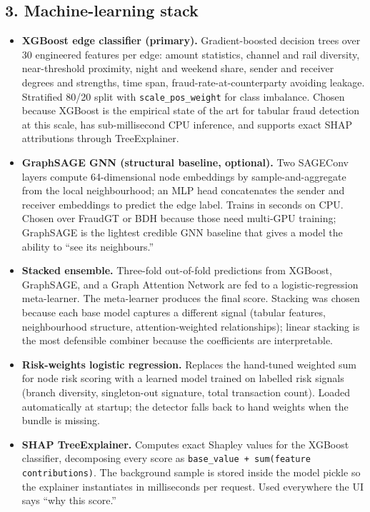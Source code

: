 \documentclass[10pt,a4paper]{article}
\begin{document}
\newpage

\subsection*{3. Machine-learning stack}
\begin{itemize}
  \item \textbf{XGBoost edge classifier (primary).} Gradient-boosted decision trees over 30 engineered features per edge: amount statistics, channel and rail diversity, near-threshold proximity, night and weekend share, sender and receiver degrees and strengths, time span, fraud-rate-at-counterparty avoiding leakage. Stratified 80/20 split with \texttt{scale\_pos\_weight} for class imbalance. Chosen because XGBoost is the empirical state of the art for tabular fraud detection at this scale, has sub-millisecond CPU inference, and supports exact SHAP attributions through TreeExplainer.
  \item \textbf{GraphSAGE GNN (structural baseline, optional).} Two SAGEConv layers compute 64-dimensional node embeddings by sample-and-aggregate from the local neighbourhood; an MLP head concatenates the sender and receiver embeddings to predict the edge label. Trains in seconds on CPU. Chosen over FraudGT or BDH because those need multi-GPU training; GraphSAGE is the lightest credible GNN baseline that gives a model the ability to ``see its neighbours.''
  \item \textbf{Stacked ensemble.} Three-fold out-of-fold predictions from XGBoost, GraphSAGE, and a Graph Attention Network are fed to a logistic-regression meta-learner. The meta-learner produces the final score. Stacking was chosen because each base model captures a different signal (tabular features, neighbourhood structure, attention-weighted relationships); linear stacking is the most defensible combiner because the coefficients are interpretable.
  \item \textbf{Risk-weights logistic regression.} Replaces the hand-tuned weighted sum for node risk scoring with a learned model trained on labelled risk signals (branch diversity, singleton-out signature, total transaction count). Loaded automatically at startup; the detector falls back to hand weights when the bundle is missing.
  \item \textbf{SHAP TreeExplainer.} Computes exact Shapley values for the XGBoost classifier, decomposing every score as \texttt{base\_value + sum(feature contributions)}. The background sample is stored inside the model pickle so the explainer instantiates in milliseconds per request. Used everywhere the UI says ``why this score.''
\end{itemize}
\end{document}
